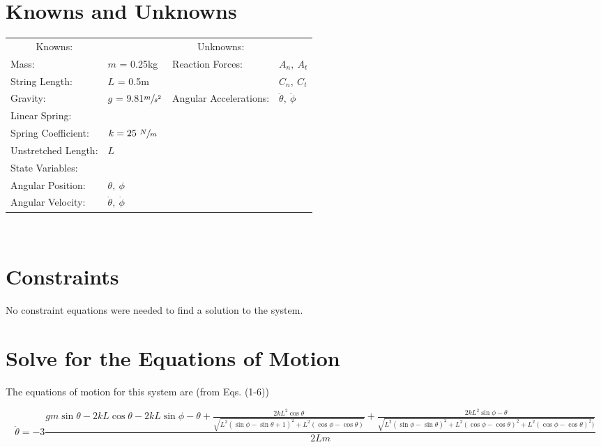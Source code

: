 \documentclass[12pt]{report}
\begin{document}
\begin{flushleft}
\section{Knowns and Unknowns} \label{knownsandunknowns}
\begin{tabular}{ll@{\hskip .75in}ll}
  \multicolumn{1}{c}{Knowns:} && \multicolumn{1}{c}{Unknowns:} \\
  Mass: &$m$ = 0.25kg & Reaction Forces: & $A_n,~A_t$ \\
  String Length: &$L$ = 0.5m & & $C_n,~C_t$\\
  Gravity: &$g$ = 9.81$\sfrac{m}{s^2}$& Angular Accelerations: & $\ddot{\theta},~\ddot{\phi}$ \\
  Linear Spring: \\
  \quad Spring Coefficient:& $k = 25~\sfrac{N}{m}$\\
  \quad Unstretched Length:& $L$ \\
  State Variables: \\
  \quad Angular Position: &$\theta,~\phi$ & \\
  \quad Angular Velocity: &$\dot{\theta},~\dot{\phi}$ & \\
\end{tabular}
\vspace{2ex}
\\

\section{Constraints}
No constraint equations were needed to find a solution to the system.
\section{Solve for the Equations of Motion}
The equations of motion for this system are (from Eqs. (1-6))
\begin{tiny}
  $$\ddot{\theta}=-3\frac{gm\sin{\theta} - 2kL\cos{\theta} - 2kL\sin{\phi-\theta}+ \frac{2kL^2\cos{\theta}}{\sqrt{L^2(\sin{\phi}-\sin{\theta}+1)^2+ L^2(\cos{\phi} - \cos{\theta})}}+ \frac{2kL^2\sin{\phi-\theta}}{\sqrt{L^2(\sin{\phi} - \sin{\theta})^2+ L^2(\cos{\phi} - \cos{\theta})^2 + L^2(\cos{\phi} - \cos{\theta})^2)}}}{2Lm}$$


\end{tiny}
\end{flushleft}
\end{document}
